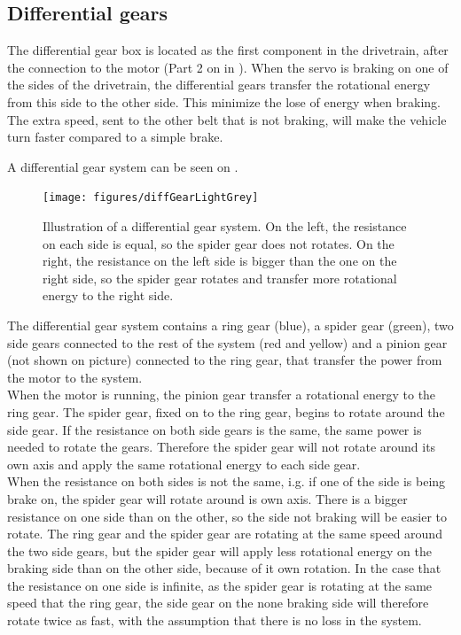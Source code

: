 \subsection{Differential gears} \label{sec:Differentialgears}

The differential gear box is located as the first component in the drivetrain, after the connection to the motor (Part 2 on  in ).
When the servo is braking on one of the sides of the drivetrain, the differential gears transfer the rotational energy from this side to the other side. This minimize the lose of energy when braking. The extra speed, sent to the other belt that is not braking, will make the vehicle turn faster compared to a simple brake.

A differential gear system can be seen on .

\begin{figure}[H]
	\centering
	\texttt{[image: figures/diffGearLightGrey]}
	\caption{Illustration of a differential gear system. On the left, the resistance on each side is equal, so the spider gear does not rotates. On the right, the resistance on the left side is bigger than the one on the right side, so the spider gear rotates and transfer more rotational energy to the right side. \cite{MechanicalEngineering}}
	\label{diffGearLight}
\end{figure}

The differential gear system contains a ring gear (blue), a spider gear (green), two side gears connected to the rest of the system (red and yellow) and a pinion gear (not shown on picture) connected to the ring gear, that transfer the power from the motor to the system.\\

When the motor is running, the pinion gear transfer a rotational energy to the ring gear. The spider gear, fixed on to the ring gear, begins to rotate around the side gear. If the resistance on both side gears is the same, the same power is needed to rotate the gears. Therefore the spider gear will not rotate around its own axis and apply the same rotational energy to each side gear.\\

When the resistance on both sides is not the same, i.g. if one of the side is being brake on, the spider gear will rotate around is own axis. There is a bigger resistance on one side than on the other, so the side not braking will be easier to rotate. The ring gear and the spider gear are rotating at the same speed around the two side gears, but the spider gear will apply less rotational energy on the braking side than on the other side, because of it own rotation. In the case that the resistance on one side is infinite, as the spider gear is rotating at the same speed that the ring gear, the side gear on the none braking side will therefore rotate twice as fast, with the assumption that there is no loss in the system.\\

